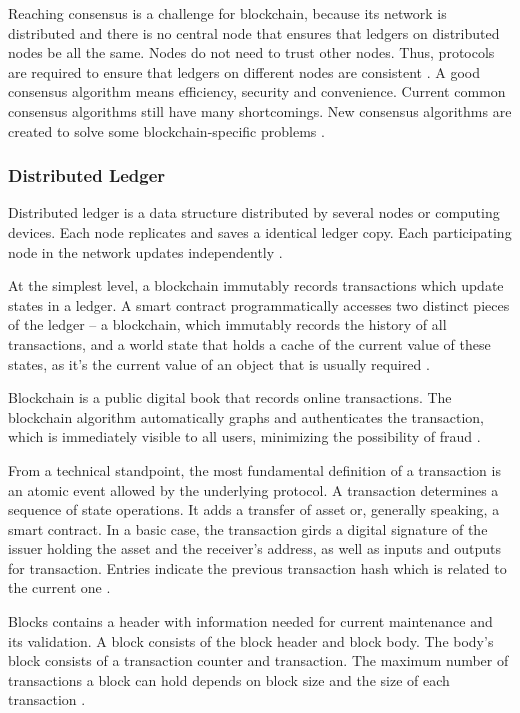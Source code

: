 Reaching consensus is a challenge for blockchain, because its network is distributed and there is no central node that ensures that ledgers on distributed nodes be all the same. Nodes do not need to trust other nodes. Thus, protocols are required to ensure that ledgers on different nodes are consistent \cite{kostarev2017review}. A good consensus algorithm means efficiency, security and convenience. Current common consensus algorithms still have many shortcomings. New consensus algorithms are created to solve some blockchain-specific problems \cite{zheng2016blockchain}.

\subsubsection{Distributed Ledger}\label{sec:livro}
Distributed ledger is a data structure distributed by several nodes or computing devices. Each node replicates and saves a identical ledger copy. Each participating node in the network updates independently \cite{greve2018blockchain}.

At the simplest level, a blockchain immutably records transactions which update states in a ledger. A smart contract programmatically accesses two distinct pieces of the ledger – a blockchain, which immutably records the history of all transactions, and a world state that holds a cache of the current value of these states, as it’s the current value of an object that is usually required \cite{zheng2016blockchain}.

\label{sec:transac}
Blockchain is a public digital book that records online transactions. The blockchain algorithm automatically graphs and authenticates the transaction, which is immediately visible to all users, minimizing the possibility of fraud \cite{Bankrate2018}.

From a technical standpoint, the most fundamental definition of a transaction is an atomic event allowed by the underlying protocol. A transaction determines a sequence of state operations. It adds a transfer of asset or, generally speaking, a smart contract. In a basic case, the transaction girds a digital signature of the issuer holding the asset and the receiver's address, as well as inputs and outputs for transaction. Entries indicate the previous transaction hash which is related to the current one \cite{greve2018blockchain}.

\label{sec:blocks}
Blocks contains a header with information needed for current maintenance and its validation. A block consists of the block header and block body. The body's block consists of a transaction counter and transaction. The maximum number of transactions a block can hold depends on block size and the size of each transaction \cite{zheng2016blockchain}.

